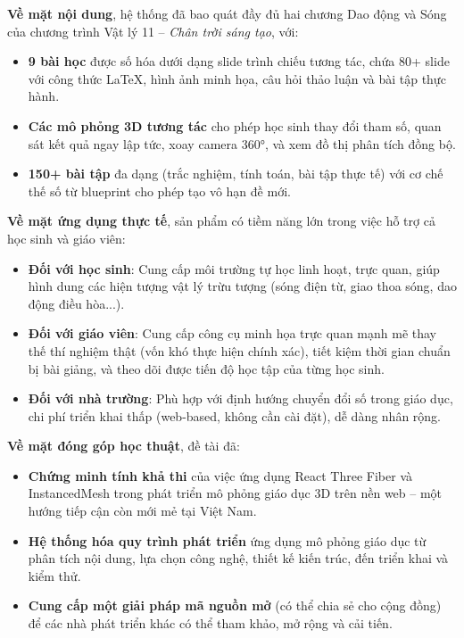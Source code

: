 \textbf{Về mặt nội dung}, hệ thống đã bao quát đầy đủ hai chương Dao động và Sóng của chương trình Vật lý 11 – \textit{Chân trời sáng tạo}, với:
\begin{itemize}
    \item \textbf{9 bài học} được số hóa dưới dạng slide trình chiếu tương tác, chứa 80+ slide với công thức LaTeX, hình ảnh minh họa, câu hỏi thảo luận và bài tập thực hành.
    \item \textbf{Các mô phỏng 3D tương tác} cho phép học sinh thay đổi tham số, quan sát kết quả ngay lập tức, xoay camera 360°, và xem đồ thị phân tích đồng bộ.
    \item \textbf{150+ bài tập} đa dạng (trắc nghiệm, tính toán, bài tập thực tế) với cơ chế thế số từ blueprint cho phép tạo vô hạn đề mới.
\end{itemize}

\textbf{Về mặt ứng dụng thực tế}, sản phẩm có tiềm năng lớn trong việc hỗ trợ cả học sinh và giáo viên:
\begin{itemize}
    \item \textbf{Đối với học sinh}: Cung cấp môi trường tự học linh hoạt, trực quan, giúp hình dung các hiện tượng vật lý trừu tượng (sóng điện từ, giao thoa sóng, dao động điều hòa...).
    \item \textbf{Đối với giáo viên}: Cung cấp công cụ minh họa trực quan mạnh mẽ thay thế thí nghiệm thật (vốn khó thực hiện chính xác), tiết kiệm thời gian chuẩn bị bài giảng, và theo dõi được tiến độ học tập của từng học sinh.
    \item \textbf{Đối với nhà trường}: Phù hợp với định hướng chuyển đổi số trong giáo dục, chi phí triển khai thấp (web-based, không cần cài đặt), dễ dàng nhân rộng.
\end{itemize}

\textbf{Về mặt đóng góp học thuật}, đề tài đã:
\begin{itemize}
    \item \textbf{Chứng minh tính khả thi} của việc ứng dụng React Three Fiber và InstancedMesh trong phát triển mô phỏng giáo dục 3D trên nền web – một hướng tiếp cận còn mới mẻ tại Việt Nam.
    \item \textbf{Hệ thống hóa quy trình phát triển} ứng dụng mô phỏng giáo dục từ phân tích nội dung, lựa chọn công nghệ, thiết kế kiến trúc, đến triển khai và kiểm thử.
    \item \textbf{Cung cấp một giải pháp mã nguồn mở} (có thể chia sẻ cho cộng đồng) để các nhà phát triển khác có thể tham khảo, mở rộng và cải tiến.
\end{itemize}

